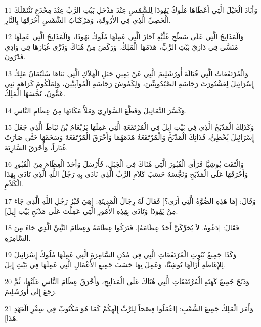 \par 11 وَأَبَادَ الْخَيْلَ الَّتِي أَعْطَاهَا مُلُوكُ يَهُوذَا لِلشَّمْسِ عِنْدَ مَدْخَلِ بَيْتِ الرَّبِّ عِنْدَ مِخْدَعِ نَثْنَمْلَكَ الْخَصِيِّ الَّذِي فِي الأَرْوِقَةِ، وَمَرْكَبَاتُِ الشَّمْسِ أَحْرَقَهَا بِالنَّارِ.
\par 12 وَالْمَذَابِحُ الَّتِي عَلَى سَطْحِ عُلِّيَّةِ آحَازَ الَّتِي عَمِلَهَا مُلُوكُ يَهُوذَا، وَالْمَذَابِحُ الَّتِي عَمِلَهَا مَنَسَّى فِي دَارَيْ بَيْتِ الرَّبِّ، هَدَمَهَا الْمَلِكُ. وَرَكَضَ مِنْ هُنَاكَ وَذَرَّى غُبَارَهَا فِي وَادِي قَدْرُونَ.
\par 13 وَالْمُرْتَفَعَاتُ الَّتِي قُبَالَةَ أُورُشَلِيمَ الَّتِي عَنْ يَمِينِ جَبَلِ الْهَلاَكِ الَّتِي بَنَاهَا سُلَيْمَانُ مَلِكُ إِسْرَائِيلَ لِعَشْتُورَثَ رَجَاسَةِ الصَّيْدُونِيِّينَ، وَلِكَمُوشَ رَجَاسَةِ الْمُوآبِيِّينَ، وَلِمَلْكُومَ كَرَاهَةِ بَنِي عَمُّونَ، نَجَّسَهَا الْمَلِكُ.
\par 14 وَكَسَّرَ التَّمَاثِيلَ وَقَطَّعَ السَّوَارِيَ وَمَلَأَ مَكَانَهَا مِنْ عِظَامِ النَّاسِ.
\par 15 وَكَذَلِكَ الْمَذْبَحُ الَّذِي فِي بَيْتِ إِيلَ فِي الْمُرْتَفَعَةِ الَّتِي عَمِلَهَا يَرُبْعَامُ بْنُ نَبَاطَ الَّذِي جَعَلَ إِسْرَائِيلَ يُخْطِئُ، فَذَانِكَ الْمَذْبَحُ وَالْمُرْتَفَعَةُ هَدَمَهُمَا وَأَحْرَقَ الْمُرْتَفَعَةَ وَسَحَقَهَا حَتَّى صَارَتْ غُبَاراً، وَأَحْرَقَ السَّارِيَةَ.
\par 16 وَالْتَفَتَ يُوشِيَّا فَرَأَى الْقُبُورَ الَّتِي هُنَاكَ فِي الْجَبَلِ، فَأَرْسَلَ وَأَخَذَ الْعِظَامَ مِنَ الْقُبُورِ وَأَحْرَقَهَا عَلَى الْمَذْبَحِ وَنَجَّسَهُ حَسَبَ كَلاَمِ الرَّبِّ الَّذِي نَادَى بِهِ رَجُلُ اللَّهِ الَّذِي نَادَى بِهَذَا الْكَلاَمِ.
\par 17 وَقَالَ: [مَا هَذِهِ الصُّوَّةُ الَّتِي أَرَى؟] فَقَالَ لَهُ رِجَالُ الْمَدِينَةِ: [هِيَ قَبْرُ رَجُلِ اللَّهِ الَّذِي جَاءَ مِنْ يَهُوذَا وَنَادَى بِهَذِهِ الأُمُورِ الَّتِي عَمِلْتَ عَلَى مَذْبَحِ بَيْتِ إِيلَ].
\par 18 فَقَالَ: [دَعُوهُ. لاَ يُحَرِّكَنَّ أَحَدٌ عِظَامَهُ]. فَتَرَكُوا عِظَامَهُ وَعِظَامَ النَّبِيِّ الَّذِي جَاءَ مِنَ السَّامِرَةِ.
\par 19 وَكَذَا جَمِيعُ بُيُوتِ الْمُرْتَفَعَاتِ الَّتِي فِي مُدُنِ السَّامِرَةِ الَّتِي عَمِلَهَا مُلُوكُ إِسْرَائِيلَ لِلإِغَاظَةِ أَزَالَهَا يُوشِيَّا، وَعَمِلَ بِهَا حَسَبَ جَمِيعِ الأَعْمَالِ الَّتِي عَمِلَهَا فِي بَيْتِ إِيلَ.
\par 20 وَذَبَحَ جَمِيعَ كَهَنَةِ الْمُرْتَفَعَاتِ الَّتِي هُنَاكَ عَلَى الْمَذَابِحِ، وَأَحْرَقَ عِظَامَ النَّاسِ عَلَيْهَا، ثُمَّ رَجَعَ إِلَى أُورُشَلِيمَ.
\par 21 وَأَمَرَ الْمَلِكُ جَمِيعَ الشَّعْبِ: [اعْمَلُوا فِصْحاً لِلرَّبِّ إِلَهِكُمْ كَمَا هُوَ مَكْتُوبٌ فِي سِفْرِ الْعَهْدِ هَذَا].

